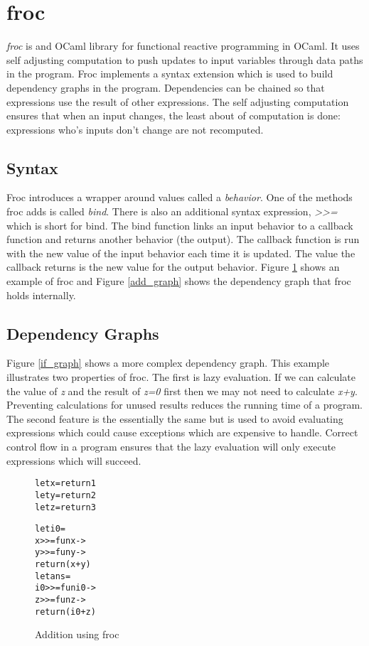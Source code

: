 \section{froc}

\emph{froc} is and OCaml library for functional reactive programming in OCaml. It uses self adjusting computation to push updates to input variables through data paths in the program. Froc implements a syntax extension which is used to build dependency graphs in the program. Dependencies can be chained so that expressions use the result of other expressions. The self adjusting computation ensures that when an input changes, the least about of computation is done: expressions who's inputs don't change are not recomputed.

\subsection{Syntax}
Froc introduces a wrapper around values called a \emph{behavior}. One of the methods froc adds is called \emph{bind}. There is also an additional syntax expression, \emph{>>=} which is short for bind. The bind function links an input behavior to a callback function and returns another behavior (the output). The callback function is run with the new value of the input behavior each time it is updated. The value the callback returns is the new value for the output behavior. Figure \ref{add_code} shows an example of froc and Figure \ref{add_graph} shows the dependency graph that froc holds internally.

\subsection{Dependency Graphs}
Figure \ref{if_graph} shows a more complex dependency graph. This example illustrates two properties of froc. The first is lazy evaluation. If we can calculate the value of \emph{z} and the result of \emph{z=0} first then we may not need to calculate \emph{x+y}. Preventing calculations for unused results reduces the running time of a program. The second feature is the essentially the same but is used to avoid evaluating expressions which could cause exceptions which are expensive to handle. Correct control flow in a program ensures that the lazy evaluation will only execute expressions which will succeed.

\begin{figure}
  \begin{alltt}
let x = return 1
let y = return 2
let z = return 3

let i0 =
    x >>= fun x ->
        y >>= fun y ->
            return (x + y)
let ans =
    i0 >>= fun i0 ->
        z >>= fun z ->
            return (i0 + z)
  \end{alltt}
  \caption{Addition using froc}
  \label{add_code}
\end{figure}

